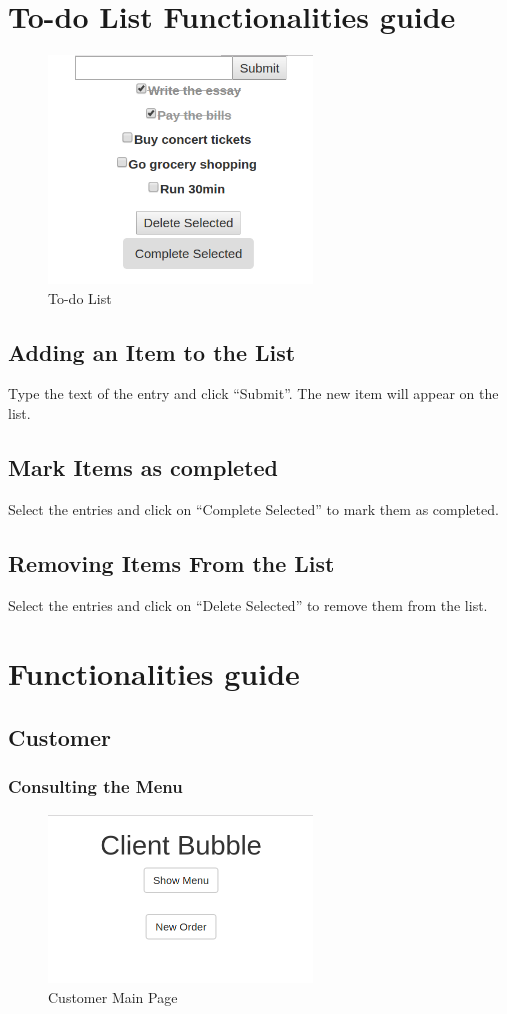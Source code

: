 \section{To-do List Functionalities guide}
\begin{figure}[H]
	\centering
	\includegraphics[width=7cm]{../../documenti/UserManualDemo/demo_screens/todo.png}
	\caption{To-do List}
\end{figure}
\subsection{Adding an Item to the List}
Type the text of the entry and click ``Submit''. The new item will appear on the list.
\subsection{Mark Items as completed}
Select the entries and click on ``Complete Selected'' to mark them as completed. 
\subsection{Removing Items From the List}
Select the entries and click on ``Delete Selected'' to remove them from the list.

\section{\DemoName{} Functionalities guide}
\subsection{Customer}
\subsubsection{Consulting the Menu}
\begin{figure}[H]
	\centering
	\includegraphics[width=7cm]{../../documenti/UserManualDemo/demo_screens/client_main.png}
	\caption{Customer Main Page}
\end{figure}
